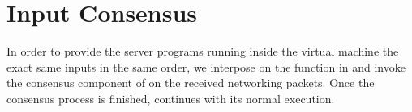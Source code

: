 \section{Input Consensus} \label{sec:input}

In order to provide the server programs running inside the virtual machine the exact same 
inputs in the same order, we interpose on the \tapsend function in \qemu and invoke the 
\paxos consensus component of \smrsystem on the received networking packets. Once the 
consensus process is finished, \qemu continues with its normal execution. 
